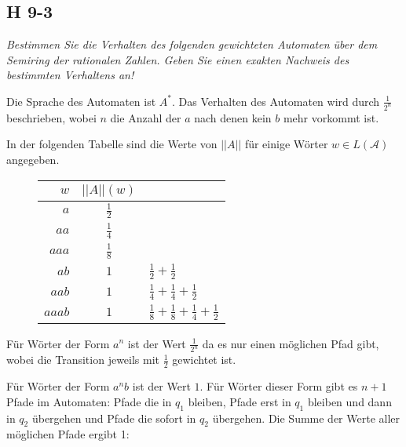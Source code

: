 \documentclass{scrartcl}
\begin{document}
\subsection{H 9-3}

\textsl{Bestimmen Sie die Verhalten des folgenden gewichteten Automaten über dem \emph{Semiring der rationalen Zahlen}. Geben Sie einen exakten Nachweis des bestimmten Verhaltens an!}

Die Sprache des Automaten ist $A^*$. Das Verhalten des Automaten wird durch $\frac{1}{2^n}$ beschrieben, wobei $n$ die Anzahl der $a$ nach denen kein $b$ mehr vorkommt ist.

In der folgenden Tabelle sind die Werte von $||A||$ für einige Wörter $w \in L(\mathcal{A})$ angegeben.

\begin{figure}[h]
  \centering
  \begin{tabular}{r|c|l}
    $w$   & $||A||(w)$ & \\
    \hline

    $a$    & $\frac{1}{2}$ \\
    $aa$   & $\frac{1}{4}$ \\
    $aaa$  & $\frac{1}{8}$ \\
    $ab$   & $1$           & $\frac{1}{2} + \frac{1}{2}$ \\
    $aab$  & $1$           & $\frac{1}{4} + \frac{1}{4} + \frac{1}{2}$ \\
    $aaab$ & $1$           & $\frac{1}{8} + \frac{1}{8} + \frac{1}{4} + \frac{1}{2}$ \\
  \end{tabular}
\end{figure}

Für Wörter der Form $a^n$ ist der Wert $\frac{1}{2^n}$ da es nur einen möglichen Pfad gibt, wobei die Transition jeweils mit $\frac{1}{2}$ gewichtet ist.

Für Wörter der Form $a^nb$ ist der Wert $1$. Für Wörter dieser Form gibt es $n+1$ Pfade im Automaten: Pfade die in $q_1$ bleiben, Pfade erst in $q_1$ bleiben und dann in $q_2$ übergehen und Pfade die sofort in $q_2$ übergehen. Die Summe der Werte aller möglichen Pfade ergibt 1:

\end{document}
